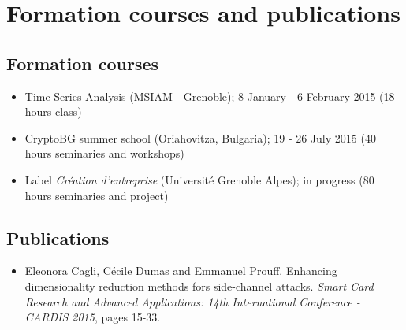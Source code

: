 \section{Formation courses and publications}
\subsection{Formation courses}
\begin{itemize}
\setlength{\itemsep}{-5pt}
\item Time Series Analysis (MSIAM - Grenoble); 8 January - 6 February 2015 (18 hours class)
\item CryptoBG summer school (Oriahovitza, Bulgaria); 19 - 26 July 2015 (40 hours seminaries and workshops)
\item Label \emph{Cr\'eation d'entreprise} (Universit\'e Grenoble Alpes); in progress (80 hours seminaries and project)
\end{itemize}

\subsection{Publications}

\begin{itemize}
\item Eleonora Cagli, C\'ecile Dumas and Emmanuel Prouff. Enhancing dimensionality reduction methods fors side-channel attacks. \emph{Smart Card Research and Advanced Applications: 14th International Conference - CARDIS 2015}, pages 15-33.
\end{itemize}